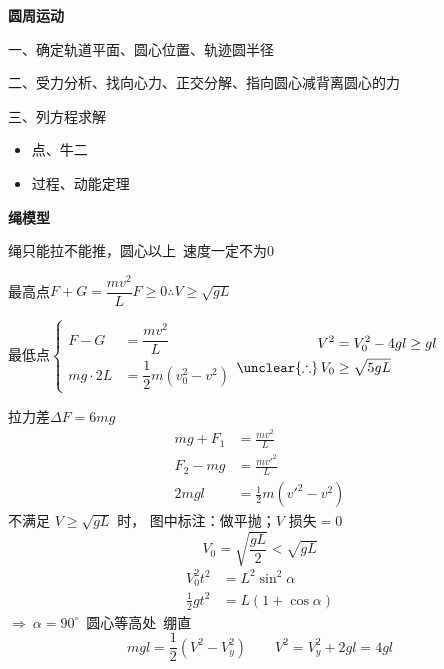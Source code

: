 \textbf{圆周运动}
\par 一、确定轨道平面、圆心位置、轨迹圆半径
\par 二、受力分析、找向心力、正交分解、指向圆心减背离圆心的力
\par 三、列方程求解
\begin{itemize}
\item 点、牛二
\item 过程、动能定理
\end{itemize}
\textbf{绳模型}
\par 绳只能拉不能推，圆心以上\ 速度一定不为0
\par 最高点\quad $F+G=\dfrac{mv^2}{L}$\qquad $F\ge0$\quad $\therefore V\ge\sqrt{gL}$
\par 最低点\quad $\left\{\begin{aligned}F-G&=\dfrac{mv^2}{L}\\ mg\cdot2L&=\dfrac{1}{2}m(v_0^2-v^2)\end{aligned}\right.$\qquad $\begin{aligned}V^2&=V_0^2-4gl\ge gl\\ \unclear{\therefore}\,V_0&\ge\sqrt{5gL}\end{aligned}$
\par 拉力差\quad $\Delta F=6mg$
\begin{align*}
mg+F_1&=\frac{mv^2}{L}\\
F_2-mg&=\frac{mv'^2}{L}\\
2mgl&=\frac{1}{2}m(v'^2-v^2)
\end{align*}
不满足 $V\ge\sqrt{gL}$ 时，
图中标注：做平抛；$V$ 损失$=0$
\[ V_0=\sqrt{\frac{gL}{2}}<\sqrt{gL} \]
\begin{align*}
V_0^2t^2&=L^2\sin^2\alpha\\
\frac{1}{2}gt^2&=L(1+\cos\alpha)
\end{align*}
$\Rightarrow\ \alpha=90^\circ$\ 圆心等高处\ 绷直
\[ mgl=\frac{1}{2}(V^2-V_y^2)\qquad V^2=V_y^2+2gl=4gl \] %
